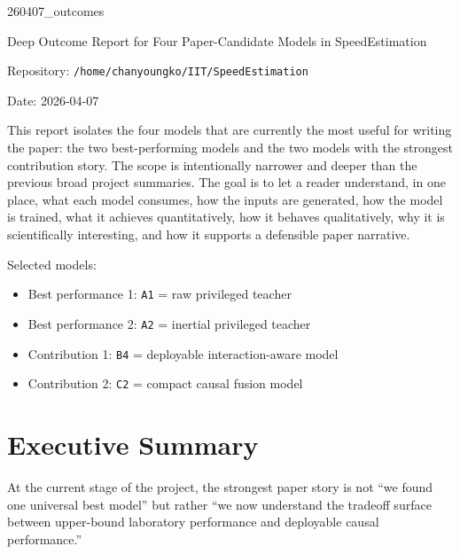 \documentclass[11pt,a4paper]{article}
\begin{document}
\begin{titlepage}
\centering
{\LARGE 260407\_outcomes\par}
\vspace{0.8cm}
{\Large Deep Outcome Report for Four Paper-Candidate Models in SpeedEstimation\par}
\vspace{0.8cm}
{\large Repository: \texttt{/home/chanyoungko/IIT/SpeedEstimation}\par}
\vspace{0.4cm}
{\large Date: 2026-04-07\par}
\vspace{1.2cm}
\begin{minipage}{0.94\linewidth}
\small
This report isolates the four models that are currently the most useful for writing the paper:
the two best-performing models and the two models with the strongest contribution story.
The scope is intentionally narrower and deeper than the previous broad project summaries.
The goal is to let a reader understand, in one place, what each model consumes,
how the inputs are generated, how the model is trained, what it achieves quantitatively,
how it behaves qualitatively, why it is scientifically interesting, and how it supports a defensible paper narrative.
\end{minipage}
\vfill
\begin{minipage}{0.94\linewidth}
\small
Selected models:
\begin{itemize}
\item Best performance 1: \texttt{A1} = raw privileged teacher
\item Best performance 2: \texttt{A2} = inertial privileged teacher
\item Contribution 1: \texttt{B4} = deployable interaction-aware model
\item Contribution 2: \texttt{C2} = compact causal fusion model
\end{itemize}
\end{minipage}
\end{titlepage}

\tableofcontents
\clearpage

\section{Executive Summary}

At the current stage of the project, the strongest paper story is not ``we found one universal best model''
but rather ``we now understand the tradeoff surface between upper-bound laboratory performance and deployable causal performance.''
\end{document}
